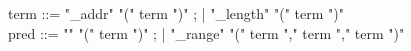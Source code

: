 \begin{syntax}
  term ::= "\base_addr" "(" term ")" ;
       | "\block_length" "(" term ")" \\
  pred ::= "\valid" "(" term ")" ;
       | "\valid_range" "(" term "," term "," term ")" \\
\end{syntax}